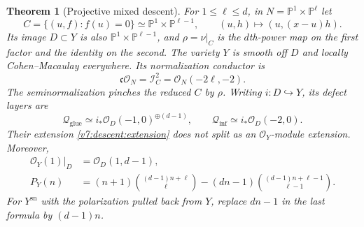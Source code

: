 \documentclass[10pt,fleqn]{article}
\numberwithin{equation}{section}
\newtheorem{theorem}{Theorem}[section]
\newcommand{\PP}{\mathbb P}
\begin{document}
\begin{theorem}[Projective mixed descent]\label{v7:mixed:projective}
For $1\le\ell\le d$, in $N=\PP^1\times\PP^\ell$ let
\[
 C=\{(u,f):f(u)=0\}\simeq\PP^1\times\PP^{\ell-1},
 \qquad (u,h)\longmapsto(u,(x-u)h).
\]
Its image $D\subset Y$ is also $\PP^1\times\PP^{\ell-1}$, and
$\rho=\nu|_C$ is the $d$th-power map on the first factor and the identity
on the second.  The variety $Y$ is smooth off $D$ and locally
Cohen--Macaulay everywhere.  Its normalization conductor is
\begin{equation}\label{v7:mixed:global-conductor}
 \mathfrak c\mathcal O_N=\mathcal I_C^2=
             \mathcal O_N(-2\ell,-2).
\end{equation}
The seminormalization pinches the reduced $C$ by $\rho$.
Writing $i:D\hookrightarrow Y$, its defect layers are
\begin{equation}\label{v7:mixed:global-layers}
 \mathcal Q_{\mathrm{glue}}\simeq i_*\mathcal O_D(-1,0)^{\oplus(d-1)},
 \qquad
 \mathcal Q_{\mathrm{inf}}\simeq i_*\mathcal O_D(-2,0).
\end{equation}
Their extension \eqref{v7:descent:extension} does not split as an
$\mathcal O_Y$-module extension.  Moreover,
\begin{align}
 \mathcal O_Y(1)|_D&=\mathcal O_D(1,d-1),\label{v7:mixed:boundary-polarization}\\
 P_Y(n)&=(n+1)\binom{(d-1)n+\ell}{\ell}
       -(dn-1)\binom{(d-1)n+\ell-1}{\ell-1}.
 \label{v7:mixed:projective-hilbert}
\end{align}
For $Y^{\mathrm{sn}}$ with the polarization pulled back from $Y$, replace
$dn-1$ in the last formula by $(d-1)n$.
\end{theorem}
\end{document}
